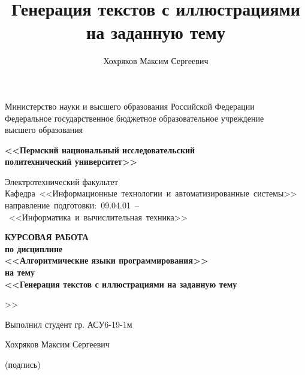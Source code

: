 \begin{titlepage}
\newcommand{\ctitle}[1]{#1\title{#1}}
\newcommand{\cauthor}[1]{#1\author{#1}}
\singlespacing

\begin{center}
	\small
	Министерство науки и высшего образования Российской Федерации\\
    Федеральное государственное бюджетное образовательное учреждение\\
    высшего образования\\
\end{center}

\begin{center}
	\bfseries
	<<Пермский национальный исследовательский\\
	политехнический университет>>
\end{center}

\begin{center}
    Электротехнический факультет\\
    \mbox{Кафедра <<Информационные технологии и автоматизированные системы>>}\\
    \mbox{направление подготовки: 09.04.01 -- <<Информатика и %
    вычислительная техника>>}
\end{center}

\vspace{3em}

\begin{center}
	\fontsize{16pt}{16pt}\selectfont\bfseries
	КУРСОВАЯ РАБОТА\\
	по дисциплине\\
	<<Алгоритмические языки программирования>>\\
	на тему\\
	<<\ctitle{Генерация текстов с иллюстрациями на заданную тему}>>
\end{center}

\vspace{2em}

\begin{center}
\hfill
\begin{minipage}{0.48\textwidth}
    Выполнил студент гр. АСУ6-19-1м

    \cauthor{Хохряков Максим Сергеевич}
    \vskip 1cm
    \underline{\hspace{\textwidth}}

    \centering\footnotesize
    (подпись)
    \end{minipage}
\end{center}


\end{titlepage}
